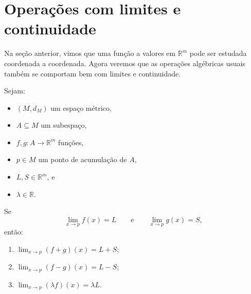 \section{Operações com limites e continuidade}

Na seção anterior, vimos que uma função a valores em $\mathbb R^m$ pode ser estudada coordenada a coordenada.
Agora veremos que as operações algébricas usuais também se comportam bem com limites e continuidade.

\begin{proposition}
    Sejam:
    \begin{itemize}
        \item $(M,d_M)$ um espaço métrico,
        \item $A\subseteq M$ um subespaço,
        \item $f,g:A\to\mathbb R^m$ funções,
        \item $p\in M$ um ponto de acumulação de $A$,
        \item $L,S\in\mathbb R^m$, e
        \item $\lambda\in\mathbb R$.
    \end{itemize}

    Se
    \[
        \lim_{x\to p} f(x)=L
        \qquad\text{e}\qquad
        \lim_{x\to p} g(x)=S,
    \]
    então:
    \begin{enumerate}[label=(\alph*)]
        \item $\displaystyle \lim_{x\to p} (f+g)(x)=L+S$;
        \item $\displaystyle \lim_{x\to p} (f-g)(x)=L-S$;
        \item $\displaystyle \lim_{x\to p} (\lambda f)(x)=\lambda L$.
    \end{enumerate}
\end{proposition}

